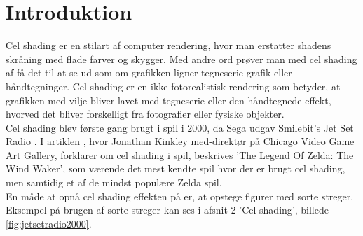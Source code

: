 \newpage
\section{Introduktion}
\setcounter{page}{1}
Cel shading er en stilart af computer rendering, hvor man erstatter shadens skråning med flade farver og skygger. Med andre ord prøver man med cel shading af få det til at se ud som om grafikken ligner tegneserie grafik eller håndtegninger. Cel shading er en ikke fotorealistisk rendering som betyder, at grafikken med vilje bliver lavet med tegneserie eller den håndtegnede effekt, hvorved det bliver forskelligt fra fotografier eller fysiske objekter. \\
Cel shading blev første gang brugt i spil i 2000, da Sega udgav  Smilebit's Jet Set Radio \cite{tvtropes}. I artiklen \cite{kinkley2016}, hvor Jonathan Kinkley med-direktør på Chicago Video Game Art Gallery, forklarer om cel shading i spil, beskrives ’The Legend Of Zelda: The Wind Waker', som værende det mest kendte spil hvor der er brugt cel shading, men samtidig et af de mindst populære Zelda spil.
\\
En måde at opnå cel shading effekten på er, at opstege figurer med sorte streger. Eksempel på brugen af sorte streger kan ses i afsnit 2 'Cel shading', billede \ref{fig:jetsetradio2000}.